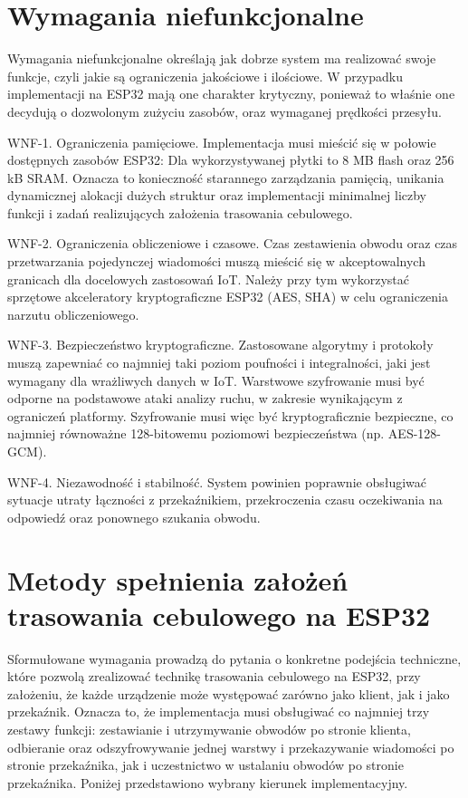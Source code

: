 \documentclass[thesis=inz,faculty=ee]{EE-dyplom}
\begin{document}
    \section{Wymagania niefunkcjonalne}

    Wymagania niefunkcjonalne określają jak dobrze system ma realizować swoje funkcje, czyli jakie są ograniczenia jakościowe i ilościowe. W przypadku implementacji na ESP32 
    mają one charakter krytyczny, ponieważ to właśnie one decydują o dozwolonym zużyciu zasobów, oraz wymaganej prędkości przesyłu.

    WNF-1. Ograniczenia pamięciowe.
    Implementacja musi mieścić się w połowie dostępnych zasobów ESP32: Dla wykorzystywanej płytki to 8 MB flash oraz 256 kB SRAM. Oznacza to konieczność starannego 
    zarządzania pamięcią, unikania dynamicznej alokacji dużych struktur oraz implementacji minimalnej liczby funkcji i zadań realizujących założenia trasowania cebulowego.

    WNF-2. Ograniczenia obliczeniowe i czasowe.
    Czas zestawienia obwodu oraz czas przetwarzania pojedynczej wiadomości muszą mieścić się w akceptowalnych granicach dla docelowych zastosowań IoT. Należy przy tym 
    wykorzystać sprzętowe akceleratory kryptograficzne ESP32 (AES, SHA) w celu ograniczenia narzutu obliczeniowego. 

    WNF-3. Bezpieczeństwo kryptograficzne.
    Zastosowane algorytmy i protokoły muszą zapewniać co najmniej taki poziom poufności i integralności, jaki jest wymagany dla wrażliwych danych w IoT. Warstwowe 
    szyfrowanie musi być odporne na podstawowe ataki analizy ruchu, w zakresie wynikającym z ograniczeń platformy. Szyfrowanie musi więc być kryptograficznie bezpieczne,
    co najmniej równoważne 128-bitowemu poziomowi bezpieczeństwa (np. AES-128-GCM).

    WNF-4. Niezawodność i stabilność.
    System powinien poprawnie obsługiwać sytuacje utraty łączności z przekaźnikiem, przekroczenia czasu oczekiwania na odpowiedź oraz ponownego szukania obwodu.

    \section{Metody spełnienia założeń trasowania cebulowego na ESP32}

    Sformułowane wymagania prowadzą do pytania o konkretne podejścia techniczne, które pozwolą zrealizować technikę trasowania cebulowego na ESP32, przy założeniu, że każde 
    urządzenie może występować zarówno jako klient, jak i jako przekaźnik. Oznacza to, że implementacja musi obsługiwać co najmniej trzy zestawy funkcji: 
    zestawianie i utrzymywanie obwodów po stronie klienta, odbieranie oraz odszyfrowywanie jednej warstwy i przekazywanie wiadomości po stronie przekaźnika, jak i uczestnictwo
    w ustalaniu obwodów po stronie przekaźnika. Poniżej przedstawiono wybrany kierunek implementacyjny.
\end{document}
